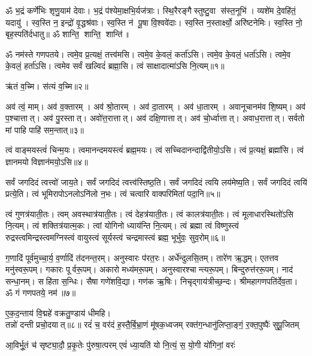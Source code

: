 


ॐ भ॒द्रं कर्णे॑भिः शृणु॒याम॑ देवाः। भ॒द्रं प॑श्येमा॒क्षभि॒र्यज॑त्राः। 
स्थि॒रैरङ्गैस्तुष्टु॒वा स॑स्त॒नूभि॑। व्यशे॑म दे॒वहि॑तं॒ यदायु॑। 
स्व॒स्ति न॒ इन्द्रो॑ वृ॒द्धश्र॑वाः। स्व॒स्ति न॑ पू॒षा वि॒श्ववे॑दाः। 
स्व॒स्ति न॒स्तार्क्ष्यो॒ अरि॑ष्टनेमिः। स्व॒स्ति नो॒ बृह॒स्पति॑र्दधातु॥
ॐ शान्ति॒ शान्ति॒ शान्ति॑॥

ॐ नम॑स्ते गणपतये। त्वमे॒व प्र॒त्यक्षं॒ तत्त्व॑मसि।
त्वमे॒व के॒वलं॒ कर्ता॑ऽसि। त्वमे॒व के॒वलं॒ धर्ता॑ऽसि।  त्वमे॒व के॒वलं॒ हर्ता॑ऽसि।
त्वमेव सर्वं खल्विदं॑ ब्रह्मा॒सि।  त्वं साक्षादात्मा॑ऽसि नि॒त्यम्॥१॥

ऋ॑तं व॒च्मि। स॑त्यं व॒च्मि॥२॥

अव॑ त्वं॒ माम्।  अव॑ व॒क्तारम्। अव॑ श्रो॒तारम्। अव॑ दा॒तारम्।  अव॑ धा॒तारम्।
अवानूचानम॑व शि॒ष्यम्। अव॑ प॒श्चात्तात्।  अव॑ पु॒रस्तात्। अवो॑त्त॒रात्तात्।
अव॑ दक्षि॒णात्तात्। अव॑ चो॒र्ध्वात्तात्।  अवाध॒रात्तात्।
सर्वतो मां पाहि पाहि॑ सम॒न्तात्॥३॥

त्वं वाङ्मयस्त्वं॑ चिन्म॒यः। त्वमानन्दमयस्त्वं॑ ब्रह्म॒मयः।  त्वं सच्चिदानन्दाद्वि॑तीयो॒ऽसि।
त्वं प्र॒त्यक्षं॒ ब्रह्मा॑सि।  त्वं ज्ञानमयो विज्ञान॑मयो॒ऽसि॥४॥

सर्वं जगदिदं त्वत्त्वो॑ जाय॒ते। सर्वं जगदिदं त्वत्त्व॑स्तिष्ठ॒ति।
सर्वं जगदिदं त्वयि लय॑मेष्य॒ति। सर्वं जगदिदं त्वयि॑ प्रत्ये॒ति।
त्वं भूमिरापोऽनलोऽनि॑लो न॒भः।  त्वं चत्वारि वाक्परिमिता॑ पदा॒नि॥५॥

त्वं गुणत्र॑याती॒तः।  त्वम् अवस्थात्र॑याती॒तः। त्वं देहत्र॑याती॒तः।
त्वं कालत्र॑याती॒तः। त्वं मूलाधारस्थितो॑ऽसि नि॒त्यम्। त्वं शक्तित्र॑यात्म॒कः।
त्वां योगिनो ध्याय॑न्ति नि॒त्यम्।  त्वं ब्रह्मा त्वं विष्णुस्त्वं रुद्रस्त्वमिन्द्रस्त्वमग्निस्त्वं
वायुस्त्वं सूर्यस्त्वं चन्द्रमास्त्वं ब्रह्म॒ भूर्भुवः॒ सुव॒रोम्॥६॥

ग॒णादिं पूर्व॑मुच्चा॒र्य॒ व॒र्णादिं त॑दनन्त॒रम्।  अनुस्वारः प॑रत॒रः।  अर्धे॑न्दुलसि॒तम्।
तारे॑ण ऋ॒द्धम्।  एतत्तव मनु॑स्वरू॒पम्। गकारः पू‍र्वरू॒पम्।  अकारो मध्य॑मरू॒पम्।
अनुस्वारश्चान्त्यरू॒पम्।  बिन्दुरुत्त॑ररू॒पम्। नाद॑ सन्धा॒नम्।  सहि॑ता स॒न्धिः। 
सैषा गणे॑शवि॒द्या। गण॑क ऋ॒षिः। निचृद्गाय॑त्रीच्छ॒न्दः।
श्रीमहागणपति॑र्देव॒ता। ॐ गं गणपतये॒ नम॑॥७॥

\begin{center}
ए॒क॒द॒न्ताय॑ वि॒द्महे॑ वक्रतु॒ण्डाय॑ धीमहि।\\
  तन्नो॑ दन्ती प्रचो॒दयात्॥८॥
{रदं॑ च॒ वर॑दं ह॒स्तै॒र्बि॒भ्रा॒णं मू॑षक॒ध्वजम्}
{रक्त॑ग॒न्धानु॑लिप्ता॒ङ्गं॒ र॒क्त॒पुष्पैः॑ सुपू॒जितम्}
\addtocounter{shlokacount}{8}
{आ॒विर्भू॒तं च॑ सृष्ट्या॒दौ॒ प्र॒कृ॒तेः पु॑रुषा॒त्परम्}
{एवं॑ ध्या॒यति॑ यो नि॒त्यं॒ स॒ यो॒गी यो॑गिनां॒ वरः॑}
\end{center}

